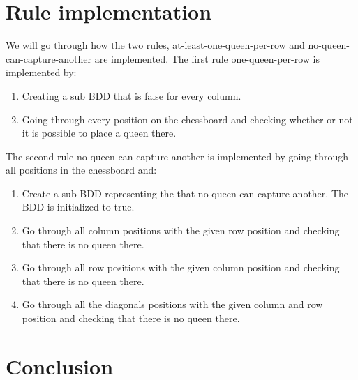 \section{Rule implementation}
We will go through how the two rules, at-least-one-queen-per-row and no-queen-can-capture-another are implemented. 
The first rule one-queen-per-row is implemented by:
\begin{enumerate}
 \item Creating a sub BDD that is false for every column.
 \item Going through every position on the chessboard and checking whether or not it is possible to place a queen there.
\end{enumerate}

The second rule no-queen-can-capture-another is implemented by going through all positions in the chessboard and:
\begin{enumerate}
	\item Create a sub BDD representing the that no queen can capture another. The BDD is initialized to true.
 	\item Go through all column positions with the given row position and checking that there is no queen there.
 	\item Go through all row positions with the given column position and checking that there is no queen there.
 	\item Go through all the diagonals positions with the given column and row position and checking that there is no queen there.
\end{enumerate}

\section{Conclusion}